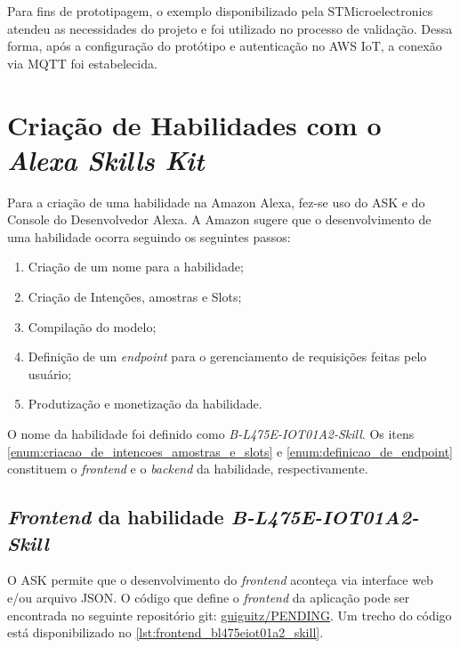 Para fins de prototipagem, o exemplo disponibilizado pela STMicroelectronics atendeu as necessidades do projeto e foi utilizado no processo de validação. Dessa forma, após a configuração do protótipo e autenticação no AWS IoT, a conexão via MQTT foi estabelecida.

\section{Criação de Habilidades com o \textit{Alexa Skills Kit}}

Para a criação de uma habilidade na Amazon Alexa, fez-se uso do ASK e do Console do Desenvolvedor Alexa. A Amazon sugere que o desenvolvimento de uma habilidade ocorra seguindo os seguintes passos:

\begin{enumerate}
    \item Criação de um nome para a habilidade;
    \item Criação de Intenções, amostras e Slots;\label{enum:criacao_de_intencoes_amostras_e_slots}
    \item Compilação do modelo;
    \item Definição de um \textit{endpoint} para o gerenciamento de requisições feitas pelo usuário;\label{enum:definicao_de_endpoint}
    \item Produtização e monetização da habilidade.
\end{enumerate}

O nome da habilidade foi definido como \textit{B-L475E-IOT01A2-Skill}. Os itens \autoref{enum:criacao_de_intencoes_amostras_e_slots} e \autoref{enum:definicao_de_endpoint} constituem o \textit{frontend} e o \textit{backend} da habilidade, respectivamente.

\subsection{\textit{Frontend} da habilidade \textit{B-L475E-IOT01A2-Skill}}\label{subscrion:frontend_bl475eiot01a2_skill}

O ASK permite que o desenvolvimento do \textit{frontend} aconteça via interface web e/ou arquivo JSON. O código que define o \textit{frontend} da aplicação pode ser encontrada no seguinte repositório git: \href{https://docs.aws.amazon.com/codecommit/latest/userguide/setting-up-ide-vs.html}{guiguitz/PENDING}. Um trecho do código está disponibilizado no \autoref{lst:frontend_bl475eiot01a2_skill}.

